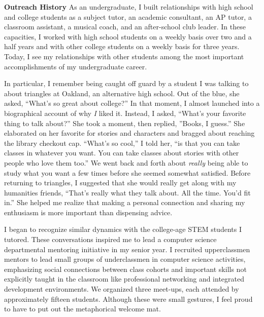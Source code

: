\textbf{Outreach History}
As an undergraduate, I built relationships with high school and college students as a subject tutor, an academic consultant, an AP tutor, a classroom assistant, a musical coach, and an after-school club leader.
In these capacities, I worked with high school students on a weekly basis over two and a half years and with other college students on a weekly basis for three years.
Today, I see my relationships with other students among the most important accomplishments of my undergraduate career.

In particular, I remember being caught off guard by a student I was talking to about triangles at Oakland, an alternative high school.
Out of the blue, she asked, ``What's so great about college?''
In that moment, I almost launched into a biographical account of why \textit{I} liked it.
Instead, I asked, ``What's your favorite thing to talk about?''
She took a moment, then replied, ''Books, I guess.''
She elaborated on her favorite for stories and characters and bragged about reaching the library checkout cap.
``What's so cool,'' I told her, ``is that you can take classes in whatever you want.
You can take classes about stories with other people who love them too.''
We went back and forth about \textit{really} being able to study what you want a few times before she seemed somewhat satisfied.
Before returning to triangles, I suggested that she would really get along with my humanities friends,
``That's really what they talk about.
All the time.
You'd fit in.''
She helped me realize that making a personal connection and sharing my enthusiasm is more important than dispensing advice.

I began to recognize similar dynamics with the college-age STEM students I tutored.
These conversations inspired me to lead a computer science departmental mentoring initiative in my senior year.
I recruited upperclassmen mentors to lead small groups of underclassmen in computer science activities, emphasizing social connections between class cohorts and important skills not explicitly taught in the classroom like professional networking and integrated development environments.
We organized three meet-ups, each attended by approximately fifteen students.
Although these were small gestures, I feel proud to have to put out the metaphorical welcome mat.
